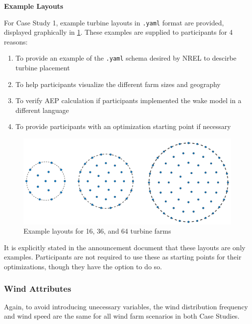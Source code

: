 \vspace{3mm}
\noindent\textbf{Example Layouts}

	\noindent For Case Study 1, example turbine layouts in \texttt{.yaml} format are provided, displayed graphically in \cref{fig:exlayouts}.
	These examples are supplied to participants for 4 reasons:

	\begin{enumerate}
		\item To provide an example of the \texttt{.yaml} schema desired by NREL to descirbe turbine placement
		\item To help participants visualize the different farm sizes and geography
		\item To verify AEP calculation if participants implemented the wake model in a different language
		\item To provide participants with an optimization starting point if necessary
	\end{enumerate}

	\begin{figure}[H]
		\centering
			\includegraphics[width=\textwidth]{./figures/iea37-exfarms.pdf}
		\caption{Example layouts for 16, 36, and 64 turbine farms}
		\label{fig:exlayouts}
	\end{figure}

	It is explicitly stated in the announcement document that these layouts are only examples.
	Participants are not required to use these as starting points for their optimizations, though they have the option to do so.

\subsubsection{Wind Attributes}

	Again, to avoid introducing unecessary variables, the wind distribution frequency and wind speed are the same for all wind farm scenarios in both Case Studies.

